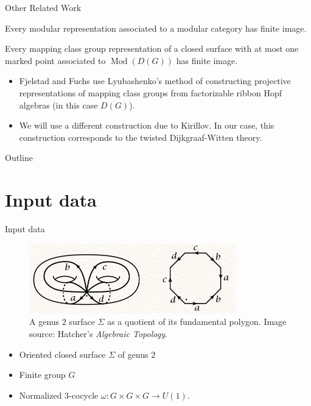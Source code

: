 \documentclass{beamer}
\DeclareMathOperator{\Mod}{Mod}
\begin{document}
\begin{frame}{Other Related Work}
\begin{theorem}
Every modular representation associated to a modular category has finite image.
\end{theorem}

\pause 

\begin{theorem}
Every mapping class group representation of a closed surface with at most one marked point associated to $\Mod(D(G))$ has finite image.
\end{theorem}

\begin{itemize}

\pause \item Fjelstad and Fuchs use Lyubashenko's method of constructing projective representations of mapping class groups from factorizable ribbon Hopf algebras (in this case $D(G)$).

\item We will use a different construction due to Kirillov.  In our case, this construction corresponds to the twisted Dijkgraaf-Witten theory.

\end{itemize}

\end{frame}

\begin{frame}{Outline}
  \tableofcontents
\end{frame}


\section{Input data}

\begin{frame}{Input data}

    \begin{figure}[h]
    \centering
    \includegraphics[width=0.8\textwidth, keepaspectratio]{hatcher-genus-2.jpg}
    \caption{A genus 2 surface $\Sigma$ as a quotient of its fundamental polygon. 
    Image source: Hatcher's \emph{Algebraic Topology}.}
    \end{figure}

  \begin{itemize}
  \item { Oriented closed surface $\Sigma$ of genus $2$
    }
  \pause \item {
    Finite group $G$
  }
  \pause \item {
    Normalized 3-cocycle $\omega: G \times G \times G \to U(1)$.
  }
  \end{itemize}
\end{frame}
\end{document}
